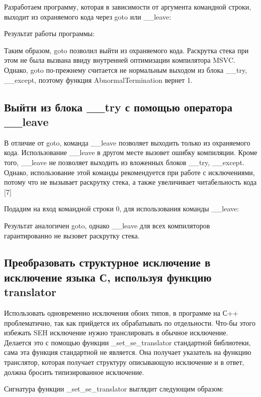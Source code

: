 \documentclass[14pt,a4paper,report]{report}
\begin{document}
Разработаем программу, которая в зависимости от аргумента командной строки, выходит из охраняемого кода через goto или \_\_leave:



Результат работы программы:



Таким образом, goto позволил выйти из охраняемого кода. Раскрутка стека при этом не была вызвана ввиду внутренней оптимизации компилятора MSVC. Однако, goto по-прежнему считается не нормальным выходом из блока \_\_try, \_\_except, поэтому функция AbnormalTermination вернет 1.

\subsection{Выйти из блока \_\_try с помощью оператора \_\_leave}

В отличие от goto, команда \_\_leave позволяет выходить только из охраняемого кода. Использование \_\_leave в другом месте вызовет ошибку компиляции. Кроме того, \_\_leave не позволяет выходить из вложенных блоков \_\_try, \_\_except. Однако, использование этой команды рекомендуется при работе с исключениями, потому что не вызывает раскрутку стека, а также увеличивает читабельность кода [7]

Подадим на вход командной строки 0, для использования команды \_\_leave:



Результат аналогичен goto, однако \_\_leave для всех компиляторов гарантированно не вызовет раскрутку стека.

\subsection{Преобразовать структурное исключение в исключение языка С, используя функцию translator}

Использовать одновременно исключения обоих типов, в программе на С++ проблематично, так как прийдется их обрабатывать по отдельности. Что-бы этого избежать SEH исключение нужно транслировать в обычное исключение. Делается это с помощью функции \_set\_se\_translator стандартной библиотеки, сама эта функция стандартной не является. Она получает указатель на функцию транслятор, которая получает структуру описывающую исключение и в ответ, должна бросить типизированное исключение.

Сигнатура функции \_set\_se\_translator выглядит следующим образом:
\end{document}
